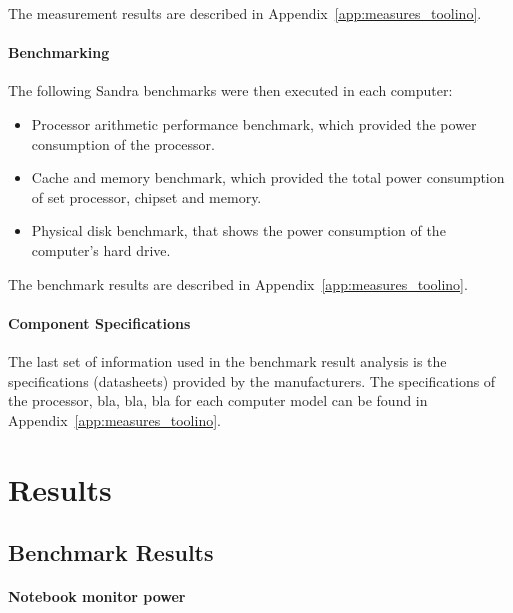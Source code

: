             The measurement results are described in Appendix~\ref{app:measures_toolino}.
            
        \paragraph*{Benchmarking}
            The following Sandra benchmarks were then executed in each computer:
            \begin{itemize}
                \item Processor arithmetic performance benchmark, which provided the power consumption of the processor.
                \item Cache and memory benchmark, which provided the total power consumption of set processor, chipset and memory.
                \item Physical disk benchmark, that shows the power consumption of the computer's hard drive.
            \end{itemize}
            
            The benchmark results are described in Appendix~\ref{app:measures_toolino}.
            
        \paragraph*{Component Specifications}
            The last set of information used in the benchmark result analysis is the specifications (datasheets) provided by the  manufacturers. 
            The specifications of the processor, bla, bla, bla for each computer model can be found in Appendix~\ref{app:measures_toolino}.
                        
            
\section{Results} \label{sec4:results}
\subsection{Benchmark Results} \label{sec4:benchmark_results}

        \paragraph*{Notebook monitor power}
        
